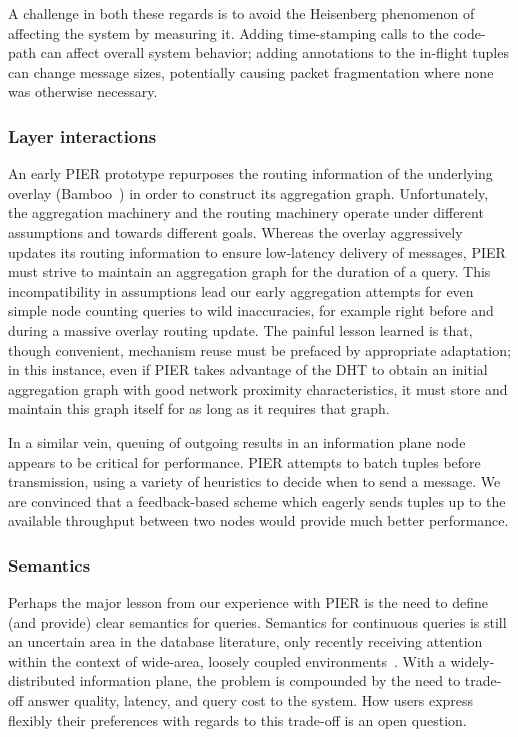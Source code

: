 \documentclass[10pt,twocolumn]{MyTightStyle}
\def\IP{information plane\xspace}
\begin{document}
A challenge in both these regards is to avoid the Heisenberg
phenomenon of affecting the system by measuring it.  Adding
time-stamping calls to the code-path can affect overall system behavior;
adding
annotations to the in-flight tuples can change message sizes,
potentially causing packet fragmentation where none was otherwise necessary.


\subsubsection*{Layer interactions}
\label{sec:layerInteraction}
An early PIER prototype repurposes the routing information of the
underlying overlay (Bamboo~\cite{rhea_usenix_2004}) in order to
construct its aggregation graph.  Unfortunately, the aggregation
machinery and the routing machinery operate under different assumptions
and towards different goals.  Whereas the overlay aggressively updates
its routing information to ensure low-latency delivery of messages, PIER
must strive to maintain an aggregation graph for the duration of a
query.  This incompatibility in assumptions lead our early aggregation
attempts for even simple node counting queries to wild inaccuracies, for
example right before and during a massive overlay routing update.  The
painful lesson learned is that, though convenient,
mechanism reuse must be prefaced by appropriate adaptation; in this
instance, even if PIER takes advantage of the DHT to obtain an initial
aggregation graph with good
network proximity characteristics, it must store and
maintain this graph itself for as long as it requires that graph.

In a similar vein, queuing of outgoing results in an \IP node appears
to be critical for
performance.  PIER attempts to batch tuples before transmission, using
a variety of heuristics to decide when to send a message.  We are
convinced that a feedback-based scheme which eagerly sends tuples up
to the available throughput between two nodes would provide much
better performance. 

\subsubsection*{Semantics} 

Perhaps the major lesson from our experience with PIER is the need to
define (and provide) clear semantics for queries.  Semantics for
continuous queries is still an uncertain area in the database
literature,
only recently receiving attention within the context of
wide-area, loosely coupled environments~\cite{Bawa2004}.  With a
widely-distributed \IP, the problem is compounded by the need to
trade-off answer quality, latency, and query cost to the system.  How
users express flexibly their preferences with regards to this trade-off
is an open question. 
\end{document}
